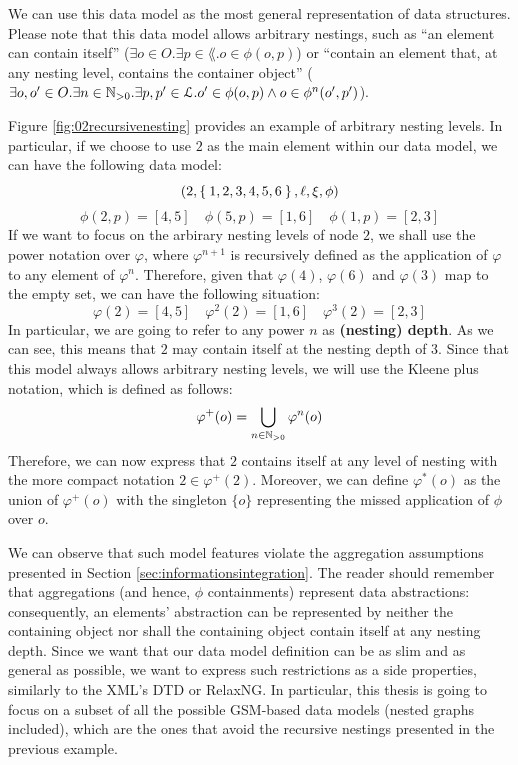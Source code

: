 We can use this data model as the most general representation of data structures. Please note that this data model allows arbitrary nestings, such as ``an element can contain itself'' ($\exists o\in O.\exists p\in\lang. o\in \phi(o,p)$) or  ``contain an element that, at any nesting level, contains the container object'' ($\exists o,o'\in O.\exists n\in\nat_{>0}.\exists p,p'\in\lang. o'\in \phi(o,p)\wedge o\in \phi^n(o',p')$). 

\begin{example}[continues=ex:nineteedGSMsnd]
	Figure \vref{fig:02recursivenesting} provides an example of arbitrary nesting levels. In particular, if we choose to use $2$ as the main element within our data model, we can have the following data model:
	\[(2,\Set{1,2,3,4,5,6},\ell,\xi,\phi)\]
	\[\phi(2,p)=[4,5]\quad \phi(5,p)=[1,6]\quad \phi(1,p)=[2,3]\]
	If we want to focus on the arbirary nesting levels of node $2$, we shall use the power notation over $\varphi$, where $\varphi^{n+1}$ is recursively defined as the application of $\varphi$ to any element of $\varphi^n$. Therefore, given that $\varphi(4)$, $\varphi(6)$ and $\varphi(3)$ map to the empty set, we can have the following situation:
	\[\varphi(2)=[4,5]\quad \varphi^2(2)=[1,6]\quad \varphi^3(2)=[2,3]\]
	In particular, we are going to refer to any power $n$ as \textbf{(nesting) depth}. 
	As we can see, this means that $2$ may contain itself at the nesting depth of $3$. Since that this model always allows arbitrary nesting levels, we will use the Kleene plus notation, which is defined as follows:
	\[\varphi^+(o)=\bigcup_{n\in\mathbb{N}_{>0}}\varphi^n(o)\]
	Therefore, we can now express that $2$ contains itself at any level of nesting with the more compact notation $2\in\varphi^+(2)$. Moreover, we can define $\varphi^*(o)$ as the union of $\varphi^+(o)$ with the singleton $\{o\}$ representing the missed application of $\phi$ over $o$.
\end{example}


We can observe that such model features violate the aggregation assumptions presented in Section \vref{sec:informationsintegration}. The reader should remember that aggregations (and hence, $\phi$ containments) represent data abstractions:  consequently, an elements' abstraction can be represented by neither the containing object  nor shall the containing object  contain itself at any nesting depth. Since we want that our data model definition can be as slim and as general as possible, we want to express such restrictions as a side properties, similarly to the XML's DTD or RelaxNG. In particular, this thesis is going to focus on a subset of all the possible GSM-based data models (nested graphs included), which are the ones that avoid the recursive nestings presented in the previous example.

